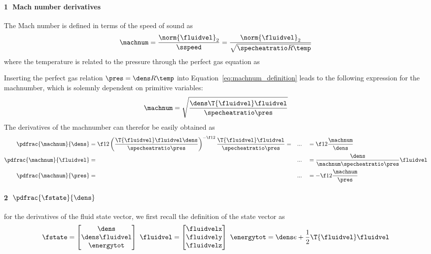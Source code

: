 \documentclass[../main.tex]{subfiles}
\begin{document}
\paragraph{\textcircled{1} Mach number derivatives}
The Mach number is defined in terms of the speed of sound as
\begin{align}\label{eq:machnum_definition}
\machnum=\frac{\norm{\fluidvel}_2}{\sspeed}=\frac{\norm{\fluidvel}_2}{\sqrt{\specheatratio R \temp}}
\end{align}
where the temperature is related to the pressure through the perfect gas equation as

Inserting the perfect gas relation $\pres=\dens R \temp$ into Equation~\eqref{eq:machnum_definition} leads to the following expression for the machnumber, which is solemnly dependent on primitive variables:
\begin{align}
\machnum=\sqrt{\frac{\dens \T{\fluidvel}\fluidvel}{\specheatratio \pres}}
\end{align}
The derivatives of the machnumber can therefor be easily obtained as
\begin{align}
\pdfrac{\machnum}{\dens}&=\f12 \left(\frac{\T{\fluidvel}\fluidvel\dens}{\specheatratio\pres}\right)^{-\f12}
\frac{\T{\fluidvel}\fluidvel}{\specheatratio\pres}=&&...&&=
\f12\frac{\machnum}{\dens}                                    \\
\pdfrac{\machnum}{\fluidvel}&=&&...&&=\frac{\dens}{\machnum\specheatratio\pres} \fluidvel  \\
\pdfrac{\machnum}{\pres}&=&&...&&=-\f12 \frac{\machnum}{\pres}
\end{align}

\paragraph{\textcircled{2} $\pdfrac{\fstate}{\dens}$    }
for the derivatives of the fluid state vector, we first recall the definition of the state vector as
\begin{align}
\fstate=
\begin{bmatrix}
  \dens          \\
  \dens\fluidvel \\
  \energytot     \\
\end{bmatrix}
~
\fluidvel=
\begin{bmatrix}
  \fluidvelx \\
  \fluidvely \\
  \fluidvelz \\
\end{bmatrix}
~
\energytot=\dens e+\frac{1}{2}\T{\fluidvel}\fluidvel
\end{align}
\end{document}
